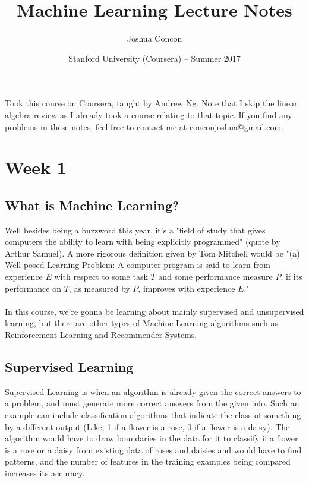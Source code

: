 \documentclass[12pt]{article}
\begin{document}
\title{Machine Learning Lecture Notes}
\date{Stanford University (Coursera) -- Summer 2017}
\author{Joshua Concon}
\maketitle

Took this course on Coursera, taught by Andrew Ng. Note that I skip the linear algebra review as I already took a course relating to that topic. If you find any problems in these notes, feel free to contact me at conconjoshua@gmail.com.

\tableofcontents

\pagebreak

\section{Week 1}

\subsection{What is Machine Learning?}

Well besides being a buzzword this year, it's a "field of study that gives computers the ability to learn with being explicitly programmed" (quote by Arthur Samuel). A more rigorous definition given by Tom Mitchell would be "(a) Well-posed Learning Problem: A computer program is said to learn from experience $E$ with respect to some task $T$ and some performance measure $P$, if its performance on $T$, as measured by $P$, improves with experience $E$."\\
\\
In this course, we're gonna be learning about mainly supervised and unsupervised learning, but there are other types of Machine Learning algorithms such as Reinforcement Learning and Recommender Systems.

\subsection{Supervised Learning}

Supervised Learning is when an algorithm is already given the correct answers to a problem, and must generate more correct answers from the given info. Such an example can include classification algorithms that indicate the class of something by a different output (Like, 1 if a flower is a rose, 0 if a flower is a daisy). The algorithm would have to draw boundaries in the data for it to classify if a flower is a rose or a daisy from existing data of roses and daisies and would have to find patterns, and the number of features in the training examples being compared increases its accuracy.
\end{document}
